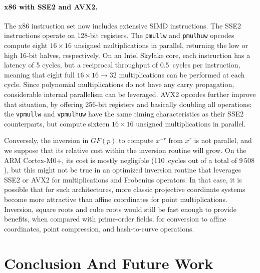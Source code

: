 \documentclass{llncs}
\newcommand{\GF}{GF}
\begin{document}
\paragraph{x86 with SSE2 and AVX2.}

The x86 instruction set now includes extensive SIMD instructions. The
SSE2 instructions operate on 128-bit registers. The \verb+pmullw+ and
\verb+pmulhuw+ opcodes compute eight $16\times 16$ unsigned
multiplications in parallel, returning the low or high 16-bit halves,
respectively. On an Intel Skylake core, each instruction has a latency
of 5 cycles, but a reciprocal throughput of 0.5~cycles per instruction,
meaning that eight full $16\times 16\rightarrow 32$ multiplications can
be performed at each cycle. Since polynomial multiplications do not have
any carry propagation, considerable internal parallelism can be
leveraged. AVX2 opcodes further improve that situation, by offering
256-bit registers and basically doubling all operations: the
\verb+vpmullw+ and \verb+vpmulhuw+ have the same timing characteristics
as their SSE2 counterparts, but compute sixteen $16\times 16$ unsigned
multiplications in parallel.

Conversely, the inversion in $\GF(p)$ to compute $x^{-r}$ from $x^r$ is
not parallel, and we suppose that its relative cost within the inversion
routine will grow. On the ARM Cortex-M0+, its cost is mostly negligible
(110~cycles out of a total of $9\,508$), but this might not be true in
an optimized inversion routine that leverages SSE2 or AVX2 for
multiplications and Frobenius operators. In that case, it is possible
that for such architectures, more classic projective coordinate systems
become more attractive than affine coordinates for point
multiplications. Inversion, square roots and cube roots would still be
fast enough to provide benefits, when compared with prime-order fields,
for conversion to affine coordinates, point compression, and
hash-to-curve operations.

\section{Conclusion And Future Work}
\end{document}
